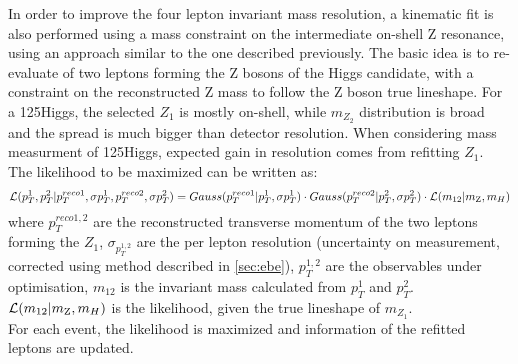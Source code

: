 In order to improve the four lepton invariant mass resolution, a kinematic fit is also performed
using a mass constraint on the intermediate on-shell Z resonance, using an approach similar to the one
described previously.
The basic idea is to re-evaluate \pT of two leptons forming 
the Z bosons of the Higgs candidate, with a constraint on the reconstructed Z mass to follow 
the Z boson true lineshape. For a 125\GeV Higgs, the selected $Z_{1}$ is mostly on-shell, 
while $m_{Z_{2}}$ distribution is broad and the spread is much bigger than detector resolution. 
When considering mass measurment of 125\GeV Higgs, expected gain in resolution comes from refitting $Z_{1}$.
The likelihood to be maximized can be written as:
\[
\mathcal{L}(p_{T}^{1} , p_{T}^{2}|p_{T}^{reco1}, \sigma p_{T}^{1},p_{T}^{reco2}, \sigma p_{T}^{2}) = 
Gauss(p_{T}^{reco1}|p_{T}^{1}, \sigma p_{T}^{1}) \cdot Gauss(p_{T}^{reco2}|p_{T}^{2}, \sigma p_{T}^{2}) 
\cdot \mathcal{L}(m_{12}|m_{\text{Z}},m_{H})
\]
where $p_{T}^{reco1,2}$ are the reconstructed transverse momentum of the two leptons forming the $Z_{1}$,
$\sigma_{p_{T}^{1,2}}$ are the per lepton resolution (uncertainty on \pT measurement, corrected using 
method described in \ref{sec:ebe}), $p_{T}^{1,2}$ are the observables under optimisation,
$m_{12}$ is the invariant mass calculated from $p_{T}^{1}$ and $p_{T}^{2}$. $\mathcal{L}(m_{12}|m_{\text{Z}},m_{H})$
is the likelihood, given the true lineshape of $m_{Z_{1}}$. \\
For each event, the likelihood is maximized and \pT information of the refitted leptons are updated. \\
